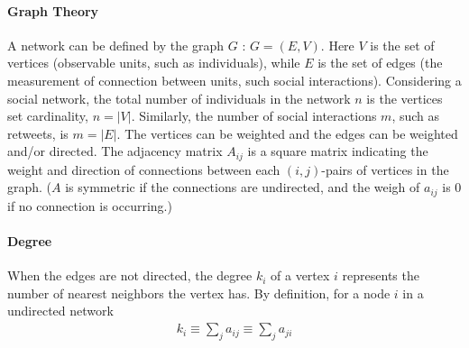 




 
        \paragraph{Graph Theory} 
        
        A network can be defined by the graph $G$ : $G=(E,V)$. Here $V$ is the set of vertices (observable units, such as individuals), while $E$ is the set of edges (the measurement of connection between units, such social interactions). Considering a social network, the total number of individuals in the network $n$ is the vertices set cardinality, $n=\lvert V \rvert$. Similarly, the number of social interactions $m$, such as retweets, is $m=\lvert E \rvert$. The vertices can be weighted and the edges can be weighted and/or directed. 
        The adjacency matrix $A_{ij}$ is a square matrix indicating the weight and direction of connections between each $(i,j)$-pairs of vertices in the graph. ($A$ is symmetric if the connections are undirected, and the weigh of $a_{ij}$ is 0 if no connection is occurring.)

        \paragraph{Degree} 
        
        When the edges are not directed, the degree $k_i$ of a vertex $i$ represents the number of nearest neighbors the vertex has. By definition, for a node $i$ in a undirected network %
        \begin{align}
            k_i \equiv \sum_{j} a_{ij}\equiv \sum_{j} a_{ji}
        \end{align}
      
